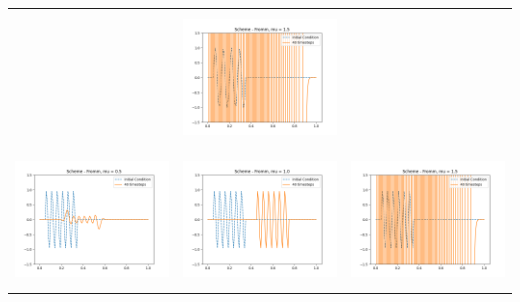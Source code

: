 \documentclass[a4paper,twoside,11pt]{article}
\begin{document}
\begin{table}[!h]
\begin{tabular}{ | c | m{5cm} | m{5cm} | }
            &
            \begin{minipage}{.3\textwidth}
              \includegraphics[width=\linewidth, height=3.5cm]{../plots/scheme6-IC3-mu1_5.png}
            \end{minipage} \\
            \begin{minipage}{.3\textwidth}
              \includegraphics[width=\linewidth, height=3.5cm]{../plots/scheme6-IC4-mu0_5.png}
            \end{minipage}
            &
            \begin{minipage}{.3\textwidth}
              \includegraphics[width=\linewidth, height=3.5cm]{../plots/scheme6-IC4-mu1_0.png}
            \end{minipage}
            &
            \begin{minipage}{.3\textwidth}
              \includegraphics[width=\linewidth, height=3.5cm]{../plots/scheme6-IC4-mu1_5.png}
            \end{minipage} \\

\end{tabular}
\end{table}
\end{document}
